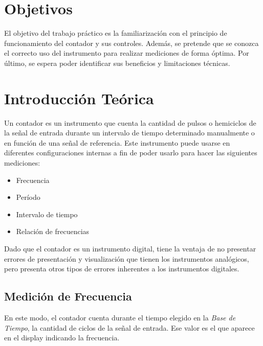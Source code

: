 \documentclass{article}
\begin{document}
\section{Objetivos}

	El objetivo del trabajo práctico es la familiarización con el principio de funcionamiento del contador y sus controles. Además, se pretende que se conozca el correcto uso del instrumento para realizar mediciones de forma óptima. Por último, se espera poder identificar sus beneficios y limitaciones técnicas.
\bigskip\bigskip




\section{Introducción Teórica}
	
	Un contador es un instrumento que cuenta la cantidad de pulsos o hemiciclos de la señal de entrada durante un intervalo de tiempo determinado manualmente o en función de una señal de referencia. Este instrumento puede usarse en diferentes configuraciones internas a fin de poder usarlo para hacer las siguientes mediciones:


\begin{itemize}
	\itemsep=3pt \topsep=0pt \partopsep=0pt \parskip=0pt \parsep=0pt
	
	\item Frecuencia
	\item Período
	\item Intervalo de tiempo
	\item Relación de frecuencias
\end{itemize}

	Dado que el contador es un instrumento digital, tiene la ventaja de no presentar errores de presentación y visualización que tienen los instrumentos analógicos, pero presenta otros tipos de errores inherentes a los instrumentos digitales.
\bigskip\bigskip



\subsection{Medición de Frecuencia}
\medskip

	En este modo, el contador cuenta durante el tiempo elegido en la \textit{Base de Tiempo}, la cantidad de ciclos de la señal de entrada. Ese valor es el que aparece en el display indicando la frecuencia.
\bigskip\bigskip
\end{document}
